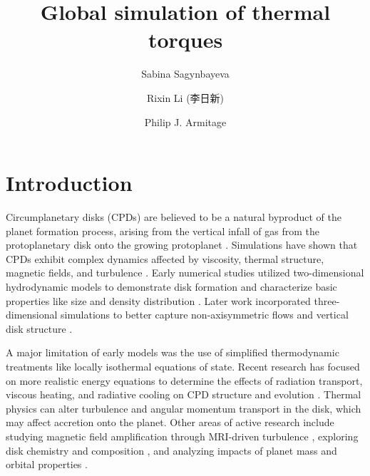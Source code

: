\documentclass[twocolumn]{aastex631}
\begin{document}
\title{Global simulation of thermal torques}

\author[0000-0002-6650-3829]{Sabina Sagynbayeva}


\author[0000-0001-9222-4367]{Rixin Li (李日新)}

\author[0000-0001-5032-1396]{Philip J. Armitage}


\begin{abstract}
   
\end{abstract}

\section{Introduction} 
\label{sec:intro}
Circumplanetary disks (CPDs) are believed to be a natural byproduct of the planet formation process, arising from the vertical infall of gas from the 
protoplanetary disk onto the growing protoplanet \citep{Ward2010}. Simulations have shown that CPDs exhibit complex dynamics affected by viscosity, 
thermal structure, magnetic fields, and turbulence \citep{Fujii2011,Gressel2013,Szul2014}. Early numerical studies utilized 
two-dimensional hydrodynamic models to demonstrate disk formation and characterize basic properties like size and density distribution \citep{Dangelo2003}. 
Later work incorporated three-dimensional simulations to better capture non-axisymmetric flows and vertical disk structure \citep{Machida2008}. 

A major limitation of early models was the use of simplified thermodynamic treatments like locally isothermal equations of state. Recent research has 
focused on more realistic energy equations to determine the effects of radiation transport, viscous heating, and radiative cooling on CPD structure and 
evolution \citep{Szul2016,Zhu2016}. Thermal physics can alter turbulence and angular momentum transport in the disk, which may affect accretion onto the planet. 
Other areas of active research include studying magnetic field amplification through MRI-driven turbulence \citep{Fujii2014}, exploring disk chemistry 
and composition \citep{Fujii2017}, and analyzing impacts of planet mass and orbital properties \citep{Szul2017a}.
\end{document}
